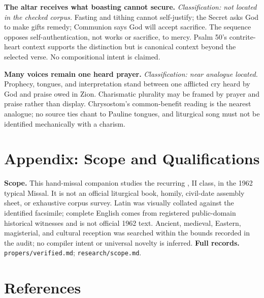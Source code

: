 \begin{deepstudy}
\noindent\textbf{The altar receives what boasting cannot secure.\enspace{}}
\emph{Classification: not located in the checked corpus.} Fasting and tithing cannot self-justify; the Secret asks God to make gifts remedy; Communion says God will accept sacrifice. The sequence opposes self-authentication, not works or sacrifice, to mercy. Psalm 50's contrite-heart context supports the distinction but is canonical context beyond the selected verse. No compositional intent is claimed.

\noindent\textbf{Many voices remain one heard prayer.\enspace{}}
\emph{Classification: near analogue located.} Prophecy, tongues, and interpretation stand between one afflicted cry heard by God and praise owed in Zion. Charismatic plurality may be framed by prayer and praise rather than display. Chrysostom's common-benefit reading is the nearest analogue; no source ties chant to Pauline tongues, and liturgical song must not be identified mechanically with a charism.

\section*{Appendix: Scope and Qualifications}

\begin{studyframe}
\textbf{Scope.} This hand-missal companion studies the recurring , II class, in the 1962 typical Missal. It is not an official liturgical book, homily, civil-date assembly sheet, or exhaustive corpus survey. Latin was visually collated against the identified facsimile; complete English comes from registered public-domain historical witnesses and is not official 1962 text. Ancient, medieval, Eastern, magisterial, and cultural reception was searched within the bounds recorded in the audit; no compiler intent or universal novelty is inferred. \textbf{Full records.} \nolinkurl{propers/verified.md}; \nolinkurl{research/scope.md}.
\end{studyframe}

\clearpage
\section*{References}


\end{deepstudy}
